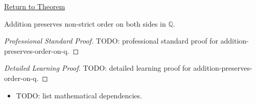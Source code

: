 \newpage
{}
\label{prf:addition-preserves-order-on-q}

\begin{remark*}[Return]
\hyperref[thm:addition-preserves-order-on-q]{Return to Theorem}
\end{remark*}

\begin{theorem*}
Addition preserves non-strict order on both sides in $\mathbb{Q}$.
\end{theorem*}

\begin{proof}[Professional Standard Proof]
\LRAProofBodyStart
TODO: professional standard proof for addition-preserves-order-on-q.
\end{proof}

\begin{proof}[Detailed Learning Proof]
\LRAProofBodyStart
TODO: detailed learning proof for addition-preserves-order-on-q.
\end{proof}

\begin{remark*}
\end{remark*}

\begin{dependencies}
\begin{itemize}
  \item TODO: list mathematical dependencies.
\end{itemize}
\end{dependencies}

\clearpage
